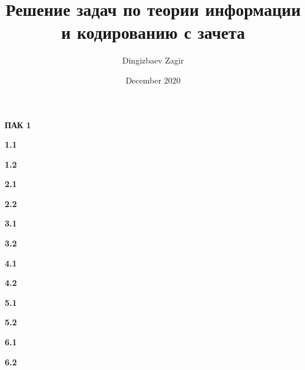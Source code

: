 \documentclass[a4paper,10pt]{article}
\title{Решение задач по теории информации и кодированию с зачета}
\author{Dingizbaev Zagir}
\date{December 2020}
\begin{document}


\begin{center}
    \textbf{\LARGE ПАК 1}
\end{center}

\setlength{\parskip}{1em}
\begin{center}
    \textbf{\large 1.1}
\end{center}


\begin{center}
    \textbf{\large 1.2}
\end{center}


\begin{center}
    \textbf{\large 2.1}
\end{center}


\begin{center}
    \textbf{\large 2.2}
\end{center}


\begin{center}
    \textbf{\large 3.1}
\end{center}


\begin{center}
    \textbf{\large 3.2}
\end{center}


\newpage
\begin{center}
    \textbf{\large 4.1}
\end{center}


\begin{center}
    \textbf{\large 4.2}
\end{center}


\begin{center}
    \textbf{\large 5.1}
\end{center}


\begin{center}
    \textbf{\large 5.2}
\end{center}


\begin{center}
    \textbf{\large 6.1}
\end{center}


\newpage
\begin{center}
    \textbf{\large 6.2}
\end{center}

\end{document}
